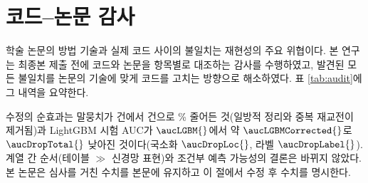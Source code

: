
\section{코드--논문 감사}
\label{sec:disc-audit}

학술 논문의 방법 기술과 실제 코드 사이의 불일치는 재현성의 주요 위협이다. 본 연구는 최종본 제출 전에 코드와 논문을 항목별로 대조하는 감사를 수행하였고, 발견된 모든 불일치를 논문의 기술에 맞게 코드를 고치는 방향으로 해소하였다. 표 \ref{tab:audit}에 그 내역을 요약한다.



수정의 순효과는 말뭉치가 \numEngagementsPaper{} 건에서 \numEngagementsCorrected{} 건으로 \corpusReductionPct{}\% 줄어든 것(일방적 정리와 중복 재교전이 제거됨)과 LightGBM 시험 AUC가 $\aucLGBM{}$에서 약 $\aucLGBMCorrected{}$로 $\aucDropTotal{}$ 낮아진 것이다(국소화 $\aucDropLoc{}$, 라벨 $\aucDropLabel{}$). 계열 간 순서(테이블 $\gg$ 신경망 표현)와 조건부 예측 가능성의 결론은 바뀌지 않았다. 본 논문은 심사를 거친 수치를 본문에 유지하고 이 절에서 수정 후 수치를 명시한다. 
